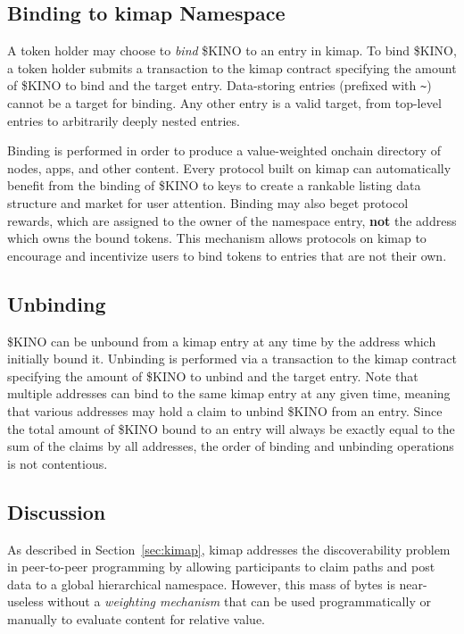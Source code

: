 \documentclass[runningheads]{llncs}
\begin{document}
\subsection{Binding to kimap Namespace}
\label{sec:kinobind}

A token holder may choose to \textit{bind} \$KINO to an entry in kimap.
To bind \$KINO, a token holder submits a transaction to the kimap contract specifying the amount of \$KINO to bind and the target entry.
Data-storing entries (prefixed with \verb|~|) cannot be a target for binding.
Any other entry is a valid target, from top-level entries to arbitrarily deeply nested entries.

Binding is performed in order to produce a value-weighted onchain directory of nodes, apps, and other content.
Every protocol built on kimap can automatically benefit from the binding of \$KINO to keys to create a rankable listing data structure and market for user attention.
Binding may also beget protocol rewards, which are assigned to the owner of the namespace entry, \textbf{not} the address which owns the bound tokens.
This mechanism allows protocols on kimap to encourage and incentivize users to bind tokens to entries that are not their own.

\subsection{Unbinding}
\label{sec:kinounbind}

\$KINO can be unbound from a kimap entry at any time by the address which initially bound it.
Unbinding is performed via a transaction to the kimap contract specifying the amount of \$KINO to unbind and the target entry.
Note that multiple addresses can bind to the same kimap entry at any given time, meaning that various addresses may hold a claim to unbind \$KINO from an entry. Since the total amount of \$KINO bound to an entry will always be exactly equal to the sum of the claims by all addresses, the order of binding and unbinding operations is not contentious.

\subsection{Discussion}
\label{sec:kinodiscussion}

As described in Section~\ref{sec:kimap}, kimap addresses the discoverability problem in peer-to-peer programming by allowing participants to claim paths and post data to a global hierarchical namespace.
However, this mass of bytes is near-useless without a \textit{weighting mechanism} that can be used programmatically or manually to evaluate content for relative value.
\end{document}
